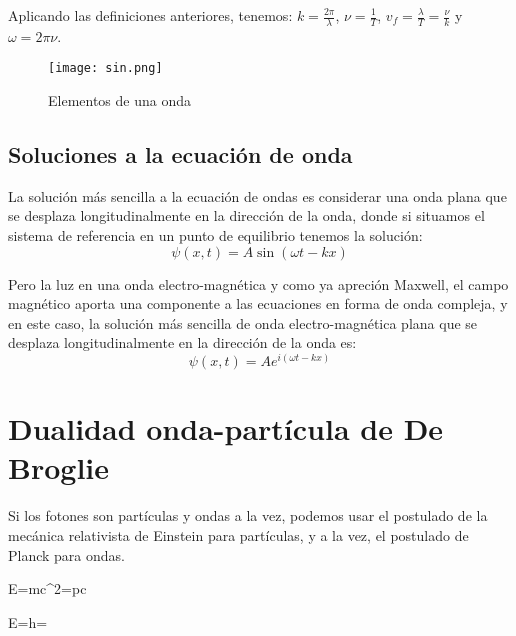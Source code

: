 Aplicando las definiciones anteriores, tenemos: $k=\frac{2\pi}{\lambda}$, $\nu=\frac{1}{T}$,
$v_f=\frac{\lambda}{T}=\frac{\nu}{k}$ y $\omega=2\pi\nu$.

\begin{figure}[htbp]
    \centering
    \texttt{[image: sin.png]}
    \caption{Elementos de una onda}
    \label{fig:elementos-onda}
\end{figure}

\subsection{Soluciones a la ecuación de onda}\label{subsec:soluciones-a-la-ecuación-de-onda}
La solución más sencilla a la ecuación de ondas es considerar una onda plana que se desplaza longitudinalmente en la dirección de la onda, donde si situamos el sistema de referencia en un punto de equilibrio tenemos la solución:
\begin{equation}
    \label{eq:solucion-ecuacion-ondas-simple}
    \psi(x,t)=A\sin(\omega t-kx)
\end{equation}

Pero la luz en una onda electro-magnética y como ya apreción Maxwell, el campo magnético aporta una componente a las ecuaciones en forma de onda compleja, y en este caso, la solución más sencilla de onda electro-magnética plana que se desplaza longitudinalmente en la dirección de la onda es:
\begin{equation}
    \label{eq:solucion-ecuacion-ondas-complejas-simple}
    \psi(x,t)=Ae^{i(\omega t-kx)}
\end{equation}


\section{Dualidad onda-partícula de De Broglie}\label{sec:dualidad-onda-partícula-de-de-broglie}

Si los fotones son partículas y ondas a la vez, podemos usar el postulado de la mecánica relativista de Einstein para partículas, y a la vez, el postulado de Planck para ondas.

\begin{postulate}
    \label{pos:energia_einstein}
    E=mc^2=pc
\end{postulate}

\begin{postulate}
    \label{pos:energia_planck}
    E=h\nu=
\end{postulate}

